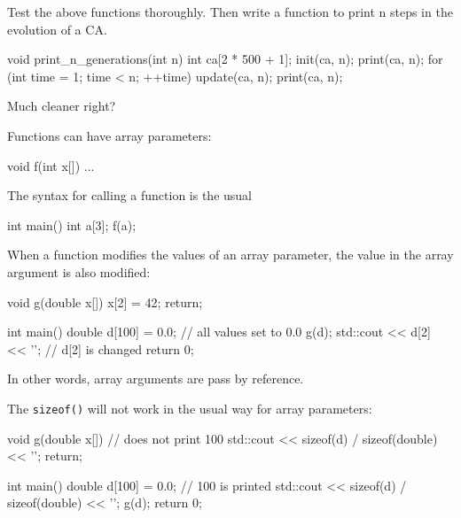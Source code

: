 Test the above functions thoroughly. Then write a function to print n steps in the evolution of a CA.

\begin{consolethree}[escapeinside=||]
void print_n_generations(int n)
{
    int ca[2 * 500 + 1];
    init(ca, n);
    print(ca, n);
    for (int time = 1; time < n; ++time)
    {
        update(ca, n);
        print(ca, n);
    }
}
\end{consolethree}

Much cleaner right?




\newpage{}

Functions can have array parameters:

\begin{consolethree}[escapeinside=||]
void f(int x[])
{
    ...
}
\end{consolethree}

The syntax for calling a function is the usual

\begin{consolethree}[escapeinside=||]
int main()
{
    int a[3];
    f(a);
}
\end{consolethree}

When a function modifies the values of an array parameter, the value in
the array argument is also modified:

\begin{consolethree}[escapeinside=||]
void g(double x[])
{
    x[2] = 42;
    return;
}

int main()
{
    double d[100] = {0.0}; // all values set to 0.0
    g(d);
    std::cout << d[2] << '\n'; // d[2] is changed
    return 0;
}
\end{consolethree}

In other words, array arguments are pass by reference.

The \texttt{sizeof()} will not work in the usual way for array parameters:

\begin{consolethree}[escapeinside=||]
void g(double x[])
{
    // does not print 100
    std::cout << sizeof(d) / sizeof(double) << '\n';
    return;
}

int main()
{
    double d[100] = {0.0};
    // 100 is printed
    std::cout << sizeof(d) / sizeof(double) << '\n';
    g(d);
    return 0;
}
\end{consolethree}

